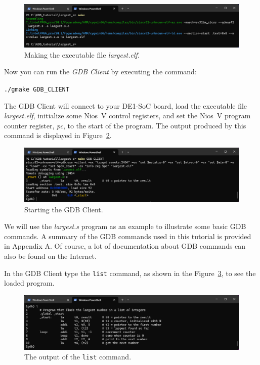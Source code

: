 \documentclass[11pt, twoside, pdftex]{article}
\begin{document}
\begin{figure}[h]
    \begin{center}
        \includegraphics[scale=.55]{figures/make_largest.png}
        \caption{Making the executable file {\it largest.elf}.}
        \label{fig:make_largest}
    \end{center}
\end{figure}

Now you can run the {\it GDB Client} by executing the command:

\texttt{./gmake GDB\_CLIENT}

The GDB Client will connect to your DE1-SoC board, load the executable file {\it largest.elf},
initialize some Nios~V control registers, and set the Nios~V program counter register, {\it pc},
to the start of the program. The output produced by this command is displayed in 
Figure~\ref{fig:gdb_client}.

\begin{figure}[h]
    \begin{center}
        \includegraphics[scale=.6]{figures/gdb_client.png}
        \caption{Starting the GDB Client.}
        \label{fig:gdb_client}
    \end{center}
\end{figure}

We will use the {\it largest.s} program as an example to illustrate some basic GDB commands. 
A summary of the GDB commands used in this tutorial is provided in Appendix A. Of course, a 
lot of documentation about GDB commands can also be found on the Internet. 

In the GDB Client type the \texttt{list} command, as shown in the 
Figure~\ref{fig:gdb1}, to see the loaded program.

\begin{figure}[h]
    \begin{center}
        \includegraphics[scale=.6]{figures/gdb1.png}
        \caption{The output of the \texttt{list} command.}
        \label{fig:gdb1}
    \end{center}
\end{figure}
\end{document}

